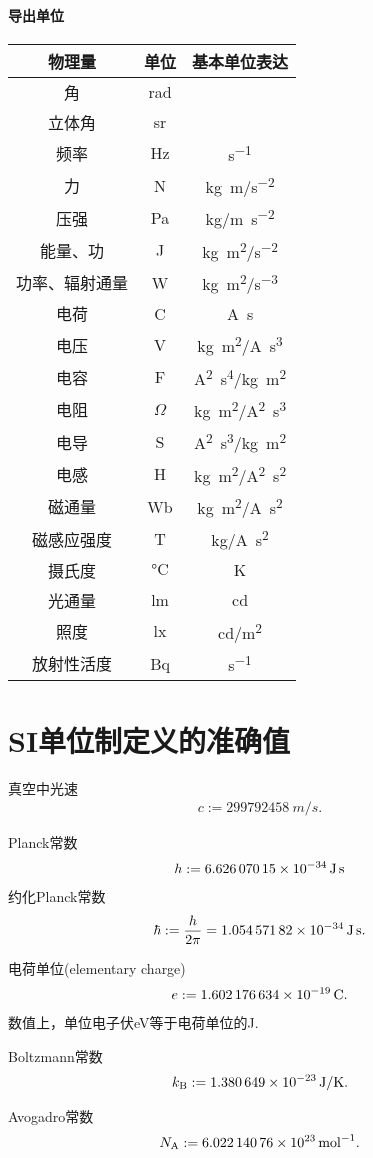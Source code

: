 \paragraph{导出单位}
\begin{center}
	\begin{tabular}{ccc}
		\toprule
		物理量&单位&基本单位表达\\
		\midrule
		角&rad&\\
		立体角&sr&\\
		频率&Hz&\si{s^{-1}}\\
		力&N&\si{kg.m/s^{-2}}\\
		压强&Pa&\si{kg/m.s^{-2}}\\
		能量、功&J&\si{kg.m^2/s^{-2}}\\
		功率、辐射通量&W&\si{kg.m^2/s^{-3}}\\
		电荷&C&\si{A.s}\\
		电压&V&\si{kg.m^2/A.s^3}\\
		电容&F&\si{A^2.s^4/kg.m^2}\\
		电阻&$\Omega$&\si{kg.m^2/A^2.s^3}\\
		电导&S&\si{A^2.s^3/kg.m^2}\\
		电感&H&\si{kg.m^2/A^2.s^2}\\
		磁通量&Wb&\si{kg.m^2/A.s^2}\\
		磁感应强度&T&\si{kg/A.s^2}\\
		摄氏度&$\si{\degreeCelsius}$&K\\
		光通量&lm&cd\\
		照度&lx&\si{cd/m^2}\\
		放射性活度&Bq&\si{s^{-1}}\\
		\bottomrule
	\end{tabular}
\end{center}
\section{SI单位制定义的准确值}
\begin{compactitem}
	\item 真空中光速
		\begin{align}
			c:=\SI{299792458}{m/s}.
		\end{align}
	\item Planck常数
		\begin{align}
			h:=\SI{6.62607015E-34}{J.s}
		\end{align}
		约化Planck常数
		\begin{align}
			\hbar:=\frac{h}{2\pi}=\SI{1.05457182E-34}{J.s}.
		\end{align}
	\item 电荷单位(elementary charge)
		\begin{align}
			e:=\SI{1.602176634E-19}{C}.
		\end{align}
		数值上，单位电子伏eV等于电荷单位的J.
	\item Boltzmann常数
		\begin{align}
			k_{\mathrm B}:=\SI{1.380649E-23}{J/K}.
		\end{align}
	\item Avogadro常数
		\begin{align}
			N_{\mathrm A}:=\SI{6.02214076E23}{mol^{-1}}.
		\end{align}
\end{compactitem}
